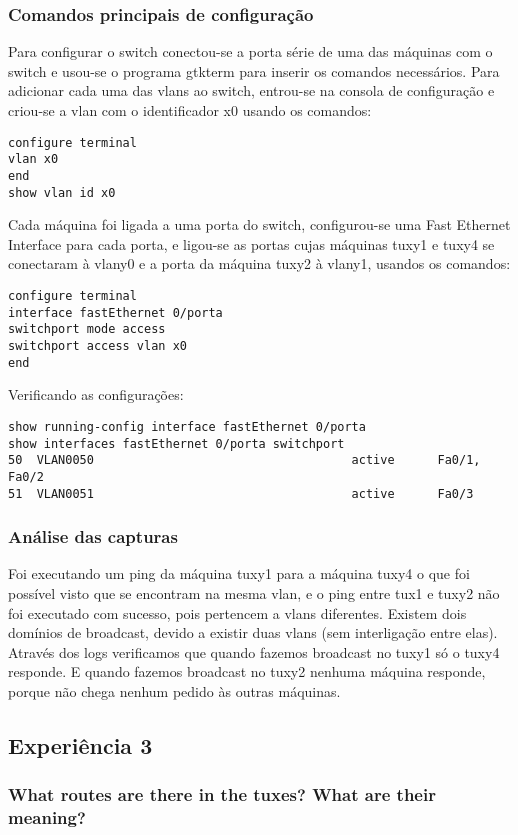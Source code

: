 \documentclass[a4paper]{article}
\begin{document}
\subsubsection{Comandos principais de configuração}
Para configurar o switch conectou-se a porta série de uma das máquinas com o switch e usou-se o programa gtkterm para inserir os comandos necessários.
Para adicionar cada uma das vlans ao switch, entrou-se na consola de configuração e criou-se a vlan com o identificador x0 usando os comandos:
\begin{verbatim}
configure terminal
vlan x0
end
show vlan id x0
\end{verbatim}
Cada máquina foi ligada a uma porta do switch, configurou-se uma Fast Ethernet Interface para cada porta, e ligou-se as portas cujas máquinas tuxy1 e tuxy4 se conectaram à vlany0 e a porta da máquina tuxy2 à vlany1, usandos os comandos:
\begin{verbatim}
configure terminal
interface fastEthernet 0/porta
switchport mode access
switchport access vlan x0
end
\end{verbatim}
Verificando as configurações:
\begin{verbatim}
show running-config interface fastEthernet 0/porta
show interfaces fastEthernet 0/porta switchport
50	VLAN0050									active		Fa0/1, Fa0/2
51 	VLAN0051									active		Fa0/3
\end{verbatim}

\subsubsection{Análise das capturas}
Foi executando um ping da máquina tuxy1 para a máquina tuxy4 o que foi possível visto que se encontram na mesma vlan, e o ping entre tux1 e tuxy2 não foi executado com sucesso, pois pertencem a vlans diferentes.
Existem dois domínios de broadcast, devido a existir duas vlans (sem interligação entre elas).
Através dos logs verificamos que quando fazemos broadcast no tuxy1 só o tuxy4 responde. E quando
fazemos broadcast no tuxy2 nenhuma máquina responde, porque não chega nenhum pedido às
outras máquinas.

\subsection{Experiência 3}

\subsubsection{What routes are there in the tuxes? What are their meaning?}
\end{document}
